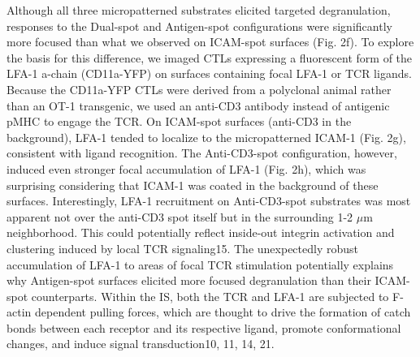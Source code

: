 Although all three micropatterned substrates elicited targeted degranulation, responses to the Dual-spot and Antigen-spot configurations were significantly more focused than what we observed on ICAM-spot surfaces (Fig. 2f). To explore the basis for this difference, we imaged CTLs expressing a fluorescent form of the LFA-1 a-chain (CD11a-YFP) on surfaces containing focal LFA-1 or TCR ligands. Because the CD11a-YFP CTLs were derived from a polyclonal animal rather than an OT-1 transgenic, we used an anti-CD3 antibody instead of antigenic pMHC to engage the TCR. On ICAM-spot surfaces (anti-CD3 in the background), LFA-1 tended to localize to the micropatterned ICAM-1 (Fig. 2g), consistent with ligand recognition. The Anti-CD3-spot configuration, however, induced even stronger focal accumulation of LFA-1 (Fig. 2h), which was surprising considering that ICAM-1 was coated in the background of these surfaces. Interestingly, LFA-1 recruitment on Anti-CD3-spot substrates was most apparent not over the anti-CD3 spot itself but in the surrounding 1-2 $\mu$m neighborhood. This could potentially reflect inside-out integrin activation and clustering induced by local TCR signaling15. The unexpectedly robust accumulation of LFA-1 to areas of focal TCR stimulation potentially explains why Antigen-spot surfaces elicited more focused degranulation than their ICAM-spot counterparts. Within the IS, both the TCR and LFA-1 are subjected to F-actin dependent pulling forces, which are thought to drive the formation of catch bonds between each receptor and its respective ligand, promote conformational changes, and induce signal transduction10, 11, 14, 21. 

